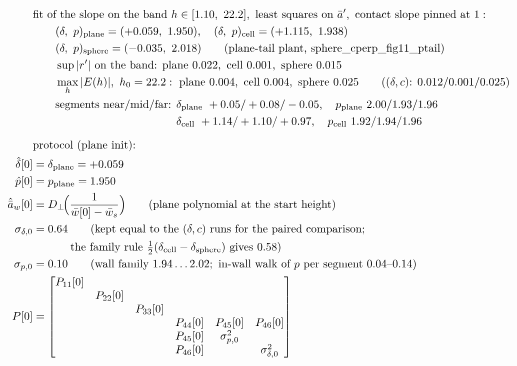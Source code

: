\documentclass[11pt,a4paper,fontset=none]{ctexart}
\newcommand{\ba}{\bar{a}}
\newcommand{\bw}{\bar{w}}
\newcommand{\ap}{\ba'}
\newcommand{\ah}{\hat{\ba}_w}
\newcommand{\ph}{\hat{p}}
\newcommand{\dl}{\delta}
\newcommand{\dlh}{\hat{\delta}}
\newcommand{\Dp}{D_{\perp}}
\begin{document}
\begin{align*}
&\text{fit of the slope on the band } h \in [1.10,\ 22.2],\ \text{least squares on } \ap,\ \text{contact slope pinned at } 1: \\
&\qquad (\dl,\ p)_{\mathrm{plane}} = (+0.059,\ 1.950),\quad (\dl,\ p)_{\mathrm{cell}} = (+1.115,\ 1.938) \\
&\qquad (\dl,\ p)_{\mathrm{sphere}} = (-0.035,\ 2.018) \qquad(\text{plane-tail plant, sphere\_cperp\_fig11\_ptail}) \\
&\qquad \sup|r'| \text{ on the band: plane } 0.022,\ \text{cell } 0.001,\ \text{sphere } 0.015 \\
&\qquad \max_h |E(h)|,\ h_0 = 22.2: \text{ plane } 0.004,\ \text{cell } 0.004,\ \text{sphere } 0.025 \qquad(\text{(}\dl, c\text{): } 0.012 / 0.001 / 0.025) \\
&\qquad \text{segments near/mid/far: } \dl_{\mathrm{plane}}\ +0.05/+0.08/-0.05,\quad p_{\mathrm{plane}}\ 2.00/1.93/1.96 \\
&\qquad\phantom{\text{segments near/mid/far: }} \dl_{\mathrm{cell}}\ +1.14/+1.10/+0.97,\quad p_{\mathrm{cell}}\ 1.92/1.94/1.96 \\[6pt]
&\text{protocol (plane init):} \\
\dlh[0] &= \dl_{\mathrm{plane}} = +0.059 \\
\ph[0]  &= p_{\mathrm{plane}} = 1.950 \\
\ah[0]  &= \Dp\!\Bigl(\frac{1}{\bw[0] - \bw_s}\Bigr) \qquad(\text{plane polynomial at the start height}) \\
\sigma_{\dl,0} &= 0.64 \qquad(\text{kept equal to the } (\dl, c) \text{ runs for the paired comparison;} \\
               &\qquad\quad\ \text{the family rule } \tfrac{1}{2}(\dl_{\mathrm{cell}} - \dl_{\mathrm{sphere}}) \text{ gives } 0.58) \\
\sigma_{p,0}   &= 0.10 \qquad(\text{wall family } 1.94\dots2.02;\ \text{in-wall walk of } p \text{ per segment } 0.04\text{--}0.14) \\
P[0]   &= \begin{bmatrix} P_{11}[0] & & & & & \\ & P_{22}[0] & & & & \\ & & P_{33}[0] & & & \\
          & & & P_{44}[0] & P_{45}[0] & P_{46}[0] \\ & & & P_{45}[0] & \sigma_{p,0}^{2} & \\ & & & P_{46}[0] & & \sigma_{\dl,0}^{2} \end{bmatrix} \\

\end{align*}
\end{document}
